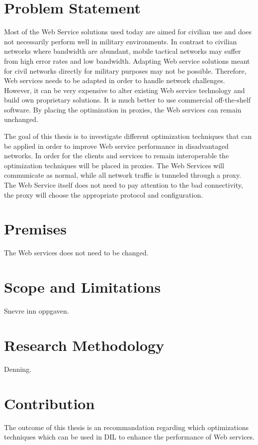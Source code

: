 \documentclass[USenglish]{ifimaster}
\begin{document}
\section{Problem Statement}
Most of the Web Service solutions used today are aimed for civilian use and does
not necessarily perform well in military environments. In contrast to civilian
networks where bandwidth are abundant, mobile tactical networks may suffer from
high error rates and low bandwidth. Adapting Web service solutions meant for
civil networks directly for military purposes may not be possible. Therefore,
Web services needs to be adapted in order to handle network challenges. However,
it can be very expensive to alter existing Web service technology and build own
proprietary solutions. It is much better to use commercial off-the-shelf
software. By placing the optimization in proxies, the Web services can remain
unchanged.

The goal of this thesis is to investigate different optimization techniques that
can be applied in order to improve Web service performance in disadvantaged
networks. In order for the clients and services to remain interoperable the
optimization techniques will be placed in proxies. The Web Services will
communicate as normal, while all network traffic is tunneled through a proxy.
The Web Service itself does not need to pay attention to the bad connectivity,
the proxy will choose the appropriate protocol and configuration.

\section{Premises}
The Web services does not need to be changed.

\section{Scope and Limitations} Snevre inn oppgaven.

\section{Research Methodology}
Denning.

\section{Contribution}
The outcome of this thesis is an recommandation regarding which optimizations techniques which can be used in DIL to enhance the performance of Web services.
\end{document}
